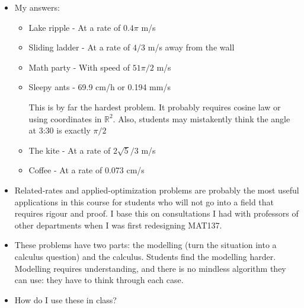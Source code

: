 \documentclass[11pt]{article}
\newcommand {\DS} [1] {${\displaystyle #1}$}
\newcommand{\R}{\mathbb{R}}
\newcommand{\nl}{\hfill \vspace{-1.1\baselineskip}} %
\begin{document}
\begin{comments}
\nl
	\begin{itemize}
		\item My answers:
			\begin{itemize}
				\item Lake ripple - At a rate of \DS{0.4 \pi} m/s
				\item Sliding ladder - At a rate of \DS{4/3} m/s away from the wall
				\item Math party - With speed of \DS{51\pi/2} m/s
				\item Sleepy ants - 69.9 cm/h or 0.194 mm/s
				
					This is by far the hardest problem.  It probably requires cosine law or using coordinates in $\R^2$.  Also, students may mistakently think the angle at 3:30 is exactly $\pi/2$
				\item The kite - At a rate of \DS{2\sqrt{5}/3} m/s
				\item Coffee - At a rate of 0.073 cm/s
			\end{itemize}
		\item  Related-rates and applied-optimization problems are probably the most useful applications in this course for students who will not go into a field that requires rigour and proof.  I base this on consultations I had with professors of other departments when I was first redesigning MAT137.
		\item  These problems have two parts: the modelling (turn the situation into a calculus question) and the calculus.  Students find the modelling harder.    Modelling requires understanding, and there is no mindless algorithm they can use: they have to think through each case.
		\item How do I use these in class?
		

\end{itemize}
\end{comments}
\end{document}
